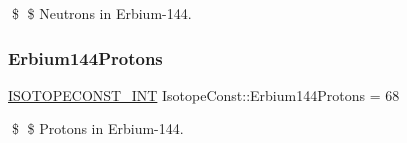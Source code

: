 \$ \$ Neutrons in Erbium-\/144. \mbox{\label{group___isotope_const-_erbium-_er144_gaa94651f1fb890ec3fbeb282e7b878d66}} 
\subsubsection{\texorpdfstring{Erbium144\+Protons}{Erbium144Protons}}
{\footnotesize\ttfamily \mbox{\hyperlink{group___isotope_const-_macros_ga5f18360b3e99483a35c32d789e62621c}{I\+S\+O\+T\+O\+P\+E\+C\+O\+N\+S\+T\+\_\+\+I\+NT}} Isotope\+Const\+::\+Erbium144\+Protons = 68}

\$ \$ Protons in Erbium-\/144. 